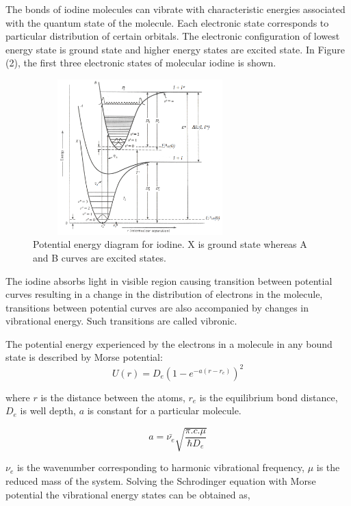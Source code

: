 \documentclass[a4paper, amsfonts, amssymb, amsmath, reprint, showkeys, nofootinbib, twoside]{revtex4-1}
\begin{document}
The bonds of  iodine molecules can vibrate with characteristic energies associated with the quantum state of the molecule. Each electronic state corresponds to particular distribution of certain orbitals. The electronic configuration of lowest energy state is ground state and higher energy states are excited state. In Figure (2), the first three electronic states of molecular iodine is shown.

\begin{figure}[H] %
	\centering
	\includegraphics[width=8.3cm,height=6cm]{1} 
	\caption{Potential energy diagram for iodine. X is ground state whereas A and B curves are excited states.}
	\label{2}
\end{figure}

The iodine absorbs light in visible region causing transition between potential curves resulting in a change in the distribution of electrons in the molecule, transitions  between potential curves are also accompanied by changes in vibrational energy. Such transitions are called vibronic.

The potential energy experienced by the electrons in a molecule in any bound state is described by Morse potential:
\begin{equation}
	U(r)=D_e(1-e^{-a(r-r_e)})^2
\end{equation}

where $r$ is the distance between the atoms, $r_e$ is the equilibrium bond distance, $D_e$ is well depth, $a$ is constant for a particular molecule.

\begin{equation}
	a=\bar{\nu_e}\sqrt{\frac{\pi.c.\mu}{\hbar D_e}}
\end{equation}

$ \nu_e $ is the wavenumber corresponding to harmonic vibrational frequency, $\mu$ is the reduced mass of the system. Solving the
Schrodinger equation with Morse potential the vibrational energy states can be obtained as,
\end{document}
